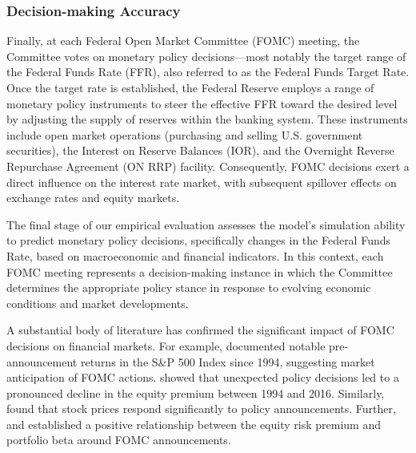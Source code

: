 






\subsubsection*{Decision-making Accuracy}
Finally, at each Federal Open Market Committee (FOMC) meeting, the Committee votes on monetary policy decisions—most notably the target range of the Federal Funds Rate (FFR), also referred to as the Federal Funds Target Rate. Once the target rate is established, the Federal Reserve employs a range of monetary policy instruments to steer the effective FFR toward the desired level by adjusting the supply of reserves within the banking system. These instruments include open market operations (purchasing and selling U.S. government securities), the Interest on Reserve Balances (IOR), and the Overnight Reverse Repurchase Agreement (ON RRP) facility. Consequently, FOMC decisions exert a direct influence on the interest rate market, with subsequent spillover effects on exchange rates and equity markets.

The final stage of our empirical evaluation assesses the model’s simulation ability to predict monetary policy decisions, specifically changes in the Federal Funds Rate, based on macroeconomic and financial indicators. In this context, each FOMC meeting represents a decision-making instance in which the Committee determines the appropriate policy stance in response to evolving economic conditions and market developments.


A substantial body of literature has confirmed the significant impact of FOMC decisions on financial markets. For example, \cite{lucca2015pre} documented notable pre-announcement returns in the S\&P 500 Index since 1994, suggesting market anticipation of FOMC actions. \cite{cieslak2019stock} showed that unexpected policy decisions led to a pronounced decline in the equity premium between 1994 and 2016. Similarly, \cite{madeira2019effect} found that stock prices respond significantly to policy announcements. Further, \cite{bodilsen2021asset} and \cite{liu2022recovering} established a positive relationship between the equity risk premium and portfolio beta around FOMC announcements.


